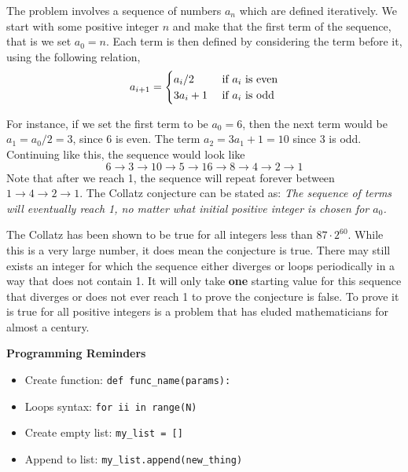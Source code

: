 \documentclass{article}
\def\prog#1{
\vspace{.1in}\begin{mdframed} \begin{center} \textbf{Programming Reminders} \end{center}#1 \end{mdframed} }
\begin{document}
	The problem involves a sequence of numbers $a_n$ which are defined iteratively.  We start with some positive integer $n$ and make that the first term of the sequence, that is we set $a_0 = n$.  Each term is then defined by considering the term before it, using the following relation,
	\[ a_{i+1} = \begin{cases} a_i/2 \hspace{.1in}& \text{ if } a_i \text{ is even} \\
 			3 a_i + 1 & \text{ if } a_i \text{ is odd}
 			\end{cases}
 		\]	
 		
 	For instance, if we set the first term to be $a_0 = 6$, then the next term would be $a_1 = a_0/2 = 3$, since 6 is even.  The term $a_2 = 3a_1 + 1 = 10$ since 3 is odd.  Continuing like this, the sequence would look like
 	\[ 6 \rightarrow 3 \rightarrow 10 \rightarrow 5 \rightarrow 16 \rightarrow 8 \rightarrow 4 \rightarrow 2 \rightarrow 1\]
 	Note that after we reach 1, the sequence will repeat forever between $1 \rightarrow 4 \rightarrow 2 \rightarrow 1$.  The Collatz conjecture can be stated as: \textit{The sequence of terms will eventually reach 1, no matter what initial positive integer is chosen for $a_0$.}
 	
 	The Collatz has been shown to be true for all integers less than $87 \cdot 2^{60}$.  While this is a very large number, it does mean the conjecture is true.  There may still exists an integer for which the sequence either diverges or loops periodically in a way that does not contain 1.  It will only take \textbf{one} starting value for this sequence that diverges or does not ever reach 1 to prove the conjecture is false.  To prove it is true for all positive integers is a problem that has eluded mathematicians for almost a century.  
 	
 	
 	
 	
 	
 	
 	

	
	
	
	
	
	
	
	
	\prog{
		\begin{itemize}
			\item Create function: \tt{def func\_name(params):}
			\item Loops syntax: \tt{for ii in range(N)}
			\item Create empty list: \tt{my\_list = []}
			\item Append to list: \tt{my\_list.append(new\_thing)}
		\end{itemize}
		}
\end{document}
